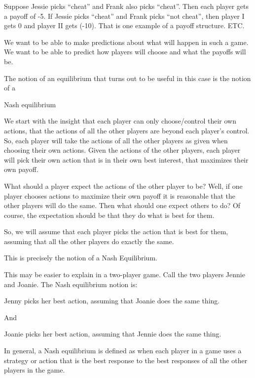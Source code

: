 \documentclass[
]{book}
\begin{document}
Suppose Jessie picks ``cheat'' and Frank also picks ``cheat''. Then each player gets a payoff of -5. If Jessie picks ``cheat'' and Frank picks ``not cheat'', then player I gets 0 and player II gets (-10). That is one example of a payoff structure. ETC.

We want to be able to make predictions about what will happen in such a game. We want to be able to predict how players will choose and what the payoffs will be.

The notion of an equilibrium that turns out to be useful in this case is the notion of a

\begin{center}
Nash equilibrium

\end{center}

We start with the insight that each player can only choose/control their own actions, that the actions of all the other players are beyond each player's control. So, each player will take the actions of all the other players as given when choosing their own actions. Given the actions of the other players, each player will pick their own action that is in their own best interest, that maximizes their own payoff.

What should a player expect the actions of the other player to be? Well, if one player chooses actions to maximize their own payoff it is reasonable that the other players will do the same. Then what should one expect others to do? Of course, the expectation should be that they do what is best for them.

So, we will assume that each player picks the action that is best for them, assuming that all the other players do exactly the same.

This is precisely the notion of a Nash Equilibrium.

This may be easier to explain in a two-player game. Call the two players Jennie and Joanie. The Nash equilibrium notion is:

\begin{center}
Jenny picks her best action, assuming that Joanie does the same thing.

And

Joanie picks her best action, assuming that Jennie does the same thing.

\end{center}

In general, a Nash equilibrium is defined as when each player in a game uses a strategy or action that is the best response to the best responses of all the other players in the game.
\end{document}
